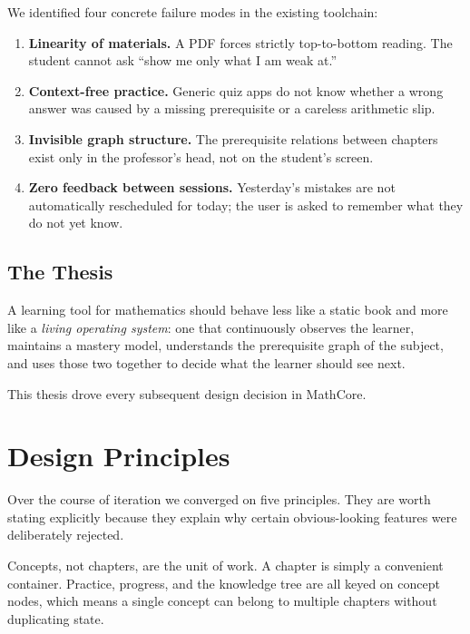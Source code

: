 \documentclass[11pt,a4paper]{article}
\begin{document}
We identified four concrete failure modes in the existing toolchain:

\begin{enumerate}[leftmargin=*]
    \item \textbf{Linearity of materials.} A PDF forces strictly top-to-bottom reading. The student cannot ask ``show me only what I am weak at.''
    \item \textbf{Context-free practice.} Generic quiz apps do not know whether a wrong answer was caused by a missing prerequisite or a careless arithmetic slip.
    \item \textbf{Invisible graph structure.} The prerequisite relations between chapters exist only in the professor's head, not on the student's screen.
    \item \textbf{Zero feedback between sessions.} Yesterday's mistakes are not automatically rescheduled for today; the user is asked to remember what they do not yet know.
\end{enumerate}

\subsection{The Thesis}

\begin{tcolorbox}[principle,title=Design Thesis]
A learning tool for mathematics should behave less like a static book and more like a \emph{living operating system}: one that continuously observes the learner, maintains a mastery model, understands the prerequisite graph of the subject, and uses those two together to decide what the learner should see next.
\end{tcolorbox}

This thesis drove every subsequent design decision in MathCore.

\section{Design Principles}
\label{sec:principles}

Over the course of iteration we converged on five principles. They are worth stating explicitly because they explain why certain obvious-looking features were deliberately rejected.

\begin{tcolorbox}[principle,title=P1. Model the Graph, Not the Book]
Concepts, not chapters, are the unit of work. A chapter is simply a convenient container. Practice, progress, and the knowledge tree are all keyed on concept nodes, which means a single concept can belong to multiple chapters without duplicating state.
\end{tcolorbox}
\end{document}
